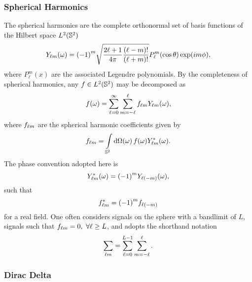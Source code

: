 \subsubsection{Spherical Harmonics}

The spherical harmonics are the complete orthonormal set of basis functions of the Hilbert space \(L^{2}(\mathbb{S}^{2})\)
%
\begin{equation}\label{eq:chapter3_spherical_harmonic}
	{Y}_{\ell m}(\omega)
	= {(-1)}^{m} \sqrt{\frac{2\ell+1}{4\pi} \frac{(\ell-m)!}{(\ell+m)!}} P^{m}_{\ell}(\cos{\theta}) \exp(i m\phi),
\end{equation}
%
where \(P^{m}_{\ell}(x)\) are the associated Legendre polynomials.
By the completeness of spherical harmonics, any \(f \in L^{2}(\mathbb{S}^{2})\) may be decomposed as
%
\begin{equation}
	f(\omega)
	= \sum\limits_{\ell=0}^{\infty} \sum\limits_{m=-\ell}^{\ell} {f}_{\ell m} {Y}_{\ell m}(\omega),
\end{equation}
%
where \({f}_{\ell m}\) are the spherical harmonic coefficients given by
%
\begin{equation}
	{f}_{\ell m}
	= \displaystyle\int\limits_{\mathbb{S}^{2}} \dd{\Omega(\omega)} f(\omega) {Y}_{\ell m}^{\ast}(\omega).
\end{equation}
%
The phase convention adopted here is
%
\begin{equation}\label{eq:chapter3_spherical_harmonic_phase}
	{Y}_{\ell m}^{\ast}(\omega)
	= {(-1)}^{m} Y_{\ell(-m)}(\omega),
\end{equation}
%
such that
%
\begin{equation}
	{f}_{\ell m}^{\ast}
	= {(-1)}^{m} f_{\ell(-m)}
\end{equation}
%
for a real field.
One often considers signals on the sphere with a bandlimit of \(L\), \ie{} signals such that \({f}_{\ell m} = 0,\ \forall \ell \geq L\), and adopts the shorthand notation
%
\begin{equation}
	\displaystyle\sum\limits_{\ell m}
	= \sum\limits_{\ell=0}^{L-1} \sum\limits_{m=-\ell}^{\ell}.
\end{equation}

\subsubsection{Dirac Delta}

